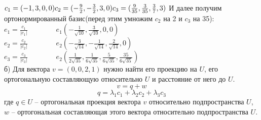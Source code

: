 \documentclass[12pt,a4paper]{scrartcl}
\begin{document}
	\noindent
	$c_1 = (-1, 3, 0, 0)\\
	c_2 = (-\frac{9}{2}, -\frac{3}{2}, 3, 0)\\
	c_3 = (\frac{9}{35}, \frac{3}{35}, \frac{3}{7}, 3)\\$
	И далее получим ортонормированный базис(перед этим умножим $c_2$ на 2 и $c_3$ на 35):\\
	$e_1 = \frac{c_1}{|c_1|}$~~~~~~~~$e_1(-\frac{1}{\sqrt{10}}, \frac{3}{\sqrt{10}}, 0, 0)$\\
	$e_2 = \frac{c_2}{|c_2|}$~~~~~~~~$e_2(-\frac{3}{\sqrt{14}}, -\frac{1}{\sqrt{14}}, \frac{2}{\sqrt{14}}, 0)$\\
	$e_3 = \frac{c_3}{|c_3|}$~~~~~~~~$e_2(\frac{1}{2\sqrt{35}}, \frac{1}{6\sqrt{35}}, \frac{5}{6\sqrt{35}}, \frac{35}{6\sqrt{35}})$\\
	б) Для вектора $v = (0, 0, 2, 1)$ нужно найти его проекцию на $U$, его ортогональную составляющую относительно $U$ и	расстояние от него до $U$.\\
	$$v = q + w$$
	$$q = \lambda_1 c_1 + \lambda_2 c_2 + \lambda_3 c_3$$
	где $q \in U$ --  ортогональная проекция вектора $v$ относительно подпространства $U$, \\$w$ -- ортогональная составляющая этого вектора относительно подпространства $U$.\\
	
\end{document}

